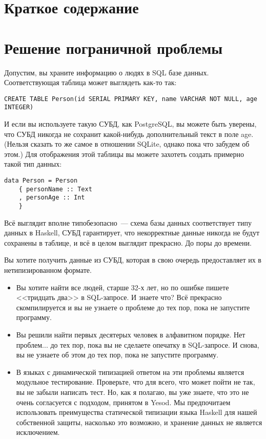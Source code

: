 \section{Краткое содержание} %


\section{Решение пограничной проблемы} %

Допустим, вы храните информацию о людях в SQL базе данных. Соответствующая таблица может выглядеть как-то так:

\begin{lstlisting}
CREATE TABLE Person(id SERIAL PRIMARY KEY, name VARCHAR NOT NULL, age INTEGER)
\end{lstlisting}

И если вы используете такую СУБД, как PostgreSQL, вы можете быть уверены, что СУБД никогда не сохранит какой-нибудь дополнительный текст в поле age. (Нельзя сказать то же самое в отношении SQLite, однако пока что забудем об этом.) Для отображения этой таблицы вы можете захотеть создать примерно такой тип данных:

\begin{lstlisting}
data Person = Person
    { personName :: Text
    , personAge :: Int
    }
\end{lstlisting}

Всё выглядит вполне типобезопасно~--- схема базы данных соответствует типу данных в Haskell, СУБД гарантирует, что некорректные данные никогда не будут сохранены в таблице, и всё в целом выглядит прекрасно. До поры до времени.

Вы хотите получить данные из СУБД, которая в свою очередь предоставляет их в нетипизированном формате.

\begin{itemize}
  \item Вы хотите найти все людей, старше 32-х лет, но по ошибке пишете <<тридцать два>> в SQL-запросе. И знаете что? Всё прекрасно скомпилируется и вы не узнаете о проблеме до тех пор, пока не запустите программу.
  \item Вы решили найти первых десятерых человек в алфавитном порядке. Нет проблем... до тех пор, пока вы не сделаете опечатку в SQL-запросе. И снова, вы не узнаете об этом до тех пор, пока не запустите программу.
  \item В языках с динамической типизацией ответом на эти проблемы является модульное тестирование. Проверьте, что для всего, что может пойти не так, вы не забыли написать тест. Но, как я полагаю, вы уже знаете, что это не очень согласуется с подходом, принятом в Yesod. Мы предпочитаем использовать преимущества статической типизации языка Haskell для нашей собственной защиты, насколько это возможно, и хранение данных не является исключением.
\end{itemize}

